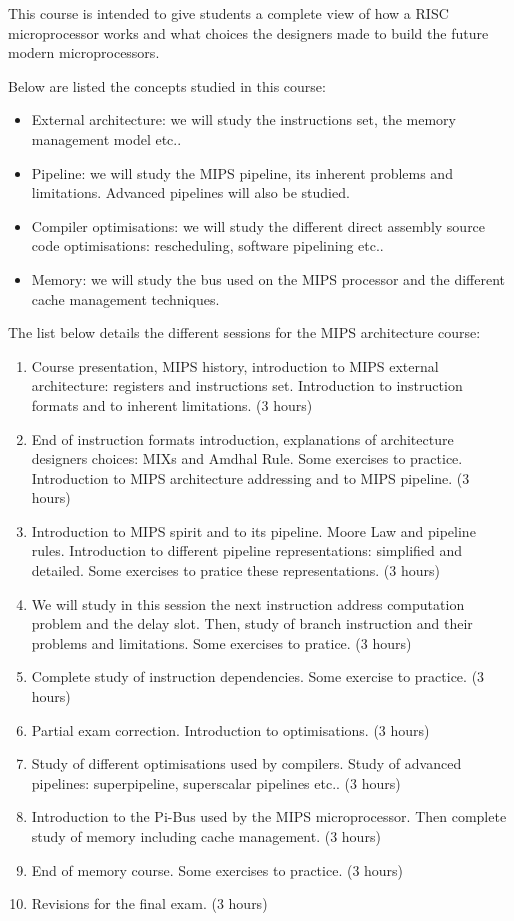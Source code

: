 \begin{multicols}{2}
This course is intended to give students a complete view of how a RISC
microprocessor works and what choices the designers made to build the
future modern microprocessors.

Below are listed the concepts studied in this course:

\begin{itemize}
  \item
    External architecture: we will study the instructions set,
    the memory management model etc..
  \item
    Pipeline: we will study the MIPS pipeline, its inherent problems
    and limitations. Advanced pipelines will also be studied.
  \item
    Compiler optimisations: we will study the different direct assembly
    source code optimisations: rescheduling, software pipelining etc..
  \item
    Memory: we will study the bus used on the MIPS processor and
    the different cache management techniques.
\end{itemize}

The list below details the different sessions for the MIPS architecture
course:

\begin{enumerate}
  \item
    Course presentation, MIPS history, introduction to MIPS external
    architecture: registers and instructions set. Introduction to
    instruction formats and to inherent limitations. (3 hours)
  \item
    End of instruction formats introduction, explanations of architecture
    designers choices: MIXs and Amdhal Rule. Some exercises to practice.
    Introduction to MIPS architecture addressing and to MIPS pipeline.
    (3 hours)
  \item
    Introduction to MIPS spirit and to its pipeline. Moore Law and
    pipeline rules. Introduction to different pipeline representations:
    simplified and detailed. Some exercises to pratice these representations.
    (3 hours)
  \item
    We will study in this session the next instruction address computation
    problem and the delay slot. Then, study of branch instruction and their
    problems and limitations. Some exercises to pratice. (3 hours)
  \item
    Complete study of instruction dependencies. Some exercise to practice.
    (3 hours)
  \item
    Partial exam correction. Introduction to optimisations. (3 hours)
  \item
    Study of different optimisations used by compilers. Study of
    advanced pipelines: superpipeline, superscalar pipelines etc.. (3 hours)
  \item
    Introduction to the Pi-Bus used by the MIPS microprocessor. Then complete
    study of memory including cache management. (3 hours)
  \item
    End of memory course. Some exercises to practice. (3 hours)
  \item
    Revisions for the final exam. (3 hours)
\end{enumerate}


\end{multicols}
